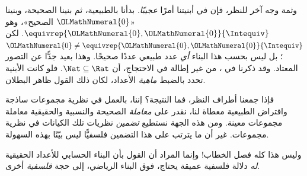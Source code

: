\documentclass[../../../include/open-logic-section]{subfiles}
\begin{document}
وثمة وجه آخر للنظر، فإن في أبنيتنا أمرًا \emph{عجيبًا}. بدأنا بالطبيعية، ثم بنينا الصحيحة، وبنينا «${\OLMathNumeral{0}}$ الصحيح»، وهو $ \equivrep{{\OLMathNumeral{0}},{\OLMathNumeral{0}}}{\Intequiv}$. لكن ${\OLMathNumeral{0}} \neq
\equivrep{{\OLMathNumeral{0}},{\OLMathNumeral{0}}}{\Intequiv}$؛ بل ليس بحسب هذا البناء \emph{أي} عدد طبيعي عددًا صحيحًا. وهذا بعيد جدًّا عن التصور المعتاد. وقد ذكرنا في ، من غير إطالة في الاحتجاج، أن $\Nat \subseteq \Rat$. فلو كانت الأبنية تحدد بالضبط \emph{ماهية} الأعداد، لكان ذلك القول ظاهر البطلان.

فإذا جمعنا أطراف النظر، فما النتيجة؟ إننا، بالعمل في نظرية مجموعات ساذجة وافتراض الطبيعية معطاة لنا، نقدر على \emph{معاملة} الصحيحة والنسبية والحقيقية معاملة مجموعات معينة. ومن هذه الجهة نستطيع \emph{تضمين} نظريات تلك الكيانات في نظرية مجموعات. غير أن ما يترتب على هذا التضمين فلسفيًّا ليس بيّنًا بهذه السهولة.

وليس هذا كله فصل الخطاب!{} وإنما المراد أن القول بأن البناء الحسابي للأعداد الحقيقية \emph{له} دلالة فلسفية عميقة يحتاج، فوق البناء الرياضي، إلى حجة \emph{فلسفية} أخرى.

\end{document}
